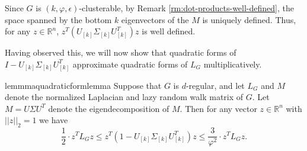 \documentclass[letterpaper,11pt]{article}
\newcommand{\R}{\mathbb{R}}
\theoremstyle{plain}
\theoremstyle{definition}
\theoremstyle{remark}
\newcommand{\e}{\epsilon}
\begin{document}
Since $G$ is $(k, \varphi, \e)$-clusterable, by Remark \ref{rm:dot-products-well-defined}, the space spanned by the bottom $k$ eigenvectors of the $M$ is uniquely defined. 
Thus, for any $z \in \R^n$,  $z^T (U_{[k]} \Sigma_{[k]} U_{[k]}^T) z$ is well defined. 

Having observed this, we will now show that quadratic forms of $I - U_{[k]}\Sigma_{[k]} U_{[k]}^T$ approximate quadratic forms of $L_G$ multiplicatively.
\begin{restatable}{lemmma}{quadraticformlemma}
\label{lem:lw-Mkmass}Suppose that $G$ is $d$-regular, and let $L_G$ and $M$ denote the normalized Laplacian and lazy random walk matrix of $G$. Let $M=U\Sigma U^T$ denote the eigendecomposition of $M$. Then for any vector $z\in \R^n$ with $||z||_2=1$ we have
\[ \frac{1}{2}  \cdot  z^T L_G z \leq z^T\left(1-  U_{[k]}\Sigma_{[k]}U_{[k]}^T \right)z \leq  \frac{3}{\varphi^2} \cdot  z^T L_G z.\]
\end{restatable}
\end{document}
